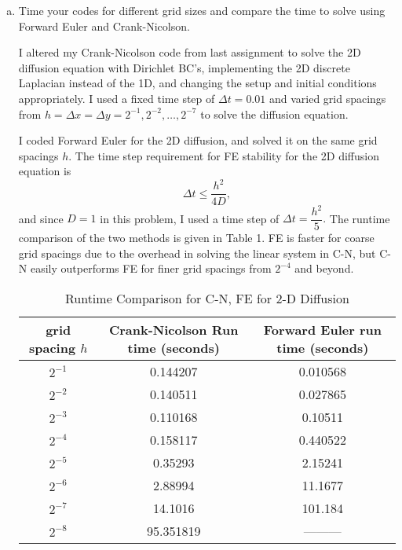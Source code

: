 \documentclass[12pt]{article}
\begin{document}
\begin{enumerate}[(a)]
\item Time your codes for different grid sizes and compare the time to solve using Forward Euler and Crank-Nicolson.

I altered my Crank-Nicolson code from last assignment to solve the 2D diffusion equation with Dirichlet BC's, implementing the 2D discrete Laplacian instead of the 1D, and changing the setup and initial conditions appropriately.  I used a fixed time step of $\Delta t = 0.01$ and varied grid spacings from $h = \Delta x = \Delta y = 2^{-1}, 2^{-2}, \dots, 2^{-7}$ to solve the diffusion equation.

I coded Forward Euler for the 2D diffusion, and solved it on the same grid spacings $h$.  The time step requirement for FE stability for the 2D diffusion equation is $$\Delta t \leq \dfrac{h^2}{4 D},$$
and since $D=1$ in this problem, I used a time step of $\Delta t = \dfrac{h^2}{5}.$
The runtime comparison of the two methods is given in Table 1.  FE is faster for coarse grid spacings due to the overhead in solving the linear system in C-N, but C-N easily outperforms FE for finer grid spacings from $2^{-4}$ and beyond.

\begin{table}[H]
\caption{Runtime Comparison for C-N, FE for 2-D Diffusion}
\centering\begin{tabular}{||c|c|c||}
\hline \hline
   grid spacing $h$ &  Crank-Nicolson Run time (seconds) &   Forward Euler run time (seconds) \\
\hline
    $2^{-1}$ &                  0.144207 &                 0.010568 \\
    $2^{-2}$ &                  0.140511 &                 0.027865 \\
    $2^{-3}$ &                  0.110168 &                 0.10511  \\
    $2^{-4}$ &                  0.158117 &                 0.440522 \\
    $2^{-5}$ &                  0.35293  &                 2.15241  \\
    $2^{-6}$ &                  2.88994  &                11.1677   \\
    $2^{-7}$ &                 14.1016   &               101.184    \\
    $2^{-8}$ &                 95.351819 &                --------- \\ 
\hline \hline
\end{tabular}
\end{table}


\end{enumerate}
\end{document}
